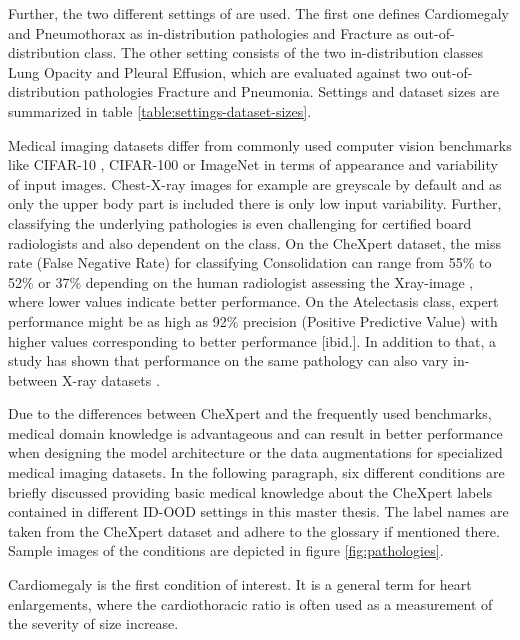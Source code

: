 Further, the two different settings of \citep{Berger2021} are used.
The first one defines Cardiomegaly and Pneumothorax as in-distribution pathologies and Fracture as out-of-distribution class.
The other setting consists of the two in-distribution classes Lung Opacity and Pleural Effusion, which are evaluated against two out-of-distribution pathologies Fracture and Pneumonia.
Settings and dataset sizes are summarized in table \ref{table:settings-dataset-sizes}.
\par
Medical imaging datasets differ from commonly used computer vision benchmarks like CIFAR-10 \citep{Krizhevsky2009a}, CIFAR-100 \citep{Krizhevsky2009b} or ImageNet \citep{Deng2009} in terms of appearance and variability of input images.
Chest-X-ray images for example are greyscale by default and as only the upper body part is included there is only low input variability.
Further, classifying the underlying pathologies is even challenging for certified board radiologists and also dependent on the class.
On the CheXpert dataset, the miss rate (False Negative Rate) for classifying Consolidation can range from 55\% to 52\% or 37\% depending on the human radiologist assessing the Xray-image \citep{Irvin2019}, where lower values indicate better performance.
On the Atelectasis class, expert performance might be as high as 92\% precision (Positive Predictive Value) with higher values corresponding to better performance [ibid.].
In addition to that, a study has shown that performance on the same pathology can also vary in-between X-ray datasets \textcolor{red}{\citep{Majkowska2020}}.
\par
Due to the differences between CheXpert and the frequently used benchmarks, medical domain knowledge is advantageous and can result in better performance when designing the model architecture or the data augmentations for specialized medical imaging datasets.
In the following paragraph, six different conditions are briefly discussed providing basic medical knowledge about the CheXpert labels contained in different ID-OOD settings in this master thesis.
The label names are taken from the CheXpert dataset \citep{Irvin2019} and adhere to the glossary \citep{Hansell2008} if mentioned there.
Sample images of the conditions are depicted in figure \ref{fig:pathologies}.
\par
Cardiomegaly is the first condition of interest.
It is a general term for heart enlargements, where the cardiothoracic ratio is often used as a measurement of the severity of size increase.
